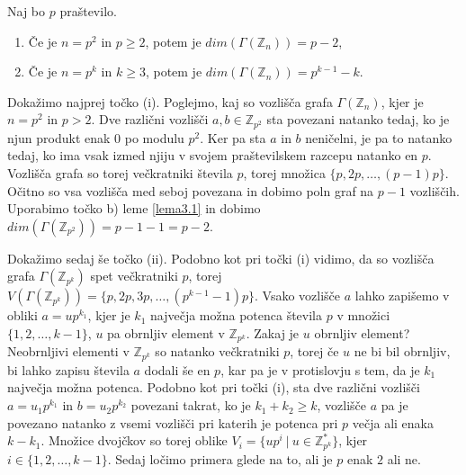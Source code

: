 \documentclass[mat1, tisk]{fmfdelo}
\newcommand{\Z}{\mathbb Z}
\begin{document}
%
\begin{trditev}
  Naj bo $p$ praštevilo.
  \begin{enumerate}[label=(\roman*)]
      \item Če je $n = p^2$ in $p \geq 2$, potem je $dim(\Gamma(\Z_{n})) = p - 2$,
      \item Če je $n = p^k$ in $k \geq 3$, potem je $dim(\Gamma(\Z_{n})) = p^{k-1} - k$.
  \end{enumerate}
\end{trditev}
\begin{dokaz}
  Dokažimo najprej točko (i).
  Poglejmo, kaj so vozlišča grafa $\Gamma(\Z_{n})$, kjer je $n = p^2$ in $p > 2$. Dve 
  različni vozlišči $a, b \in \Z_{p^2}$ sta povezani natanko tedaj, ko je njun produkt enak $0$ po modulu 
  $p^2$. Ker pa sta $a$ in $b$ neničelni, je pa to natanko tedaj, ko ima vsak izmed njiju v svojem praštevilskem 
  razcepu natanko en $p$. Vozlišča grafa so torej večkratniki števila $p$, torej množica $\{p,2p,  \ldots, (p-1)p\}$.
  Očitno so vsa vozlišča med seboj povezana in dobimo poln graf na $p-1$ vozliščih. Uporabimo točko b)
  leme \ref{lema3.1} in dobimo $dim(\Gamma(\Z_{p^2})) = p - 1 - 1 = p - 2$.

  Dokažimo sedaj še točko (ii). 
  Podobno kot pri točki (i) vidimo, da so vozlišča grafa 
  $\Gamma(\Z_{p^k})$ spet večkratniki $p$, torej $V(\Gamma(\Z_{p^k})) = \{p,2p, 3p, \ldots, (p^{k-1}-1)p\}$.
  Vsako vozlišče $a$ lahko zapišemo v obliki $a = u p^{k_1}$, kjer je $k_1$ največja možna potenca 
  števila $p$ v množici $\{1, 2, \ldots, k-1\}$, $u$ pa obrnljiv element v $\Z_{p^k}$. Zakaj je $u$ obrnljiv 
  element? Neobrnljivi elementi v $\Z_{p^k}$ so natanko večkratniki $p$, torej če $u$ ne bi bil obrnljiv, bi 
  lahko zapisu števila $a$ dodali še en $p$, kar pa je v protislovju s tem, da je $k_1$ največja možna potenca. 
  Podobno kot pri točki (i), sta dve različni vozlišči $a = u_1 p^{k_1}$ in $b = u_2 p^{k_2}$ povezani takrat, ko je 
  $k_1 + k_2 \geq k$, vozlišče $a$ pa je povezano natanko z vsemi vozlišči pri katerih je potenca pri $p$ 
  večja ali enaka $k - k_1$. 
  Množice dvojčkov so torej oblike $V_i = \{u p^i~|~  u \in  \Z_{p^k}^{*}\}$, kjer $i \in \{1, 2, \ldots, k-1\}$. 
  Sedaj ločimo primera glede na to, ali je $p$ enak $2$ ali ne.


\end{dokaz}
\end{document}
